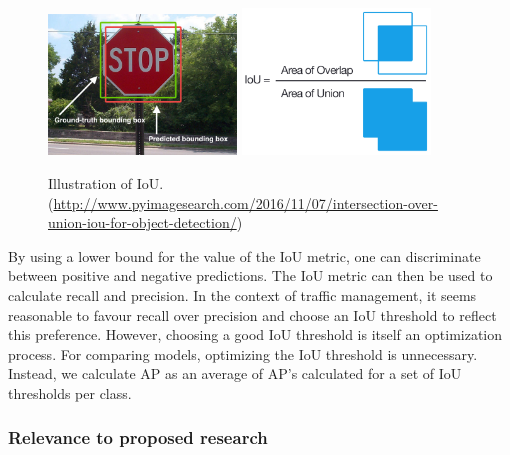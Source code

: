 \documentclass[]{article}
\begin{document}
	\begin{figure}[h]
		\centering
		\includegraphics[width=5cm]{Intersection_over_Union_-_object_detection_bounding_boxes.jpg}
		\includegraphics[width=5cm]{Intersection_over_Union_-_visual_equation.png}
		\caption{Illustration of IoU.\\ \footnotesize{(\url{http://www.pyimagesearch.com/2016/11/07/intersection-over-union-iou-for-object-detection/})}}
	\end{figure}
	
	By using a lower bound for the value of the IoU metric, one can discriminate between positive and negative predictions. The IoU metric can then be used to calculate recall and precision. In the context of traffic management, it seems reasonable to favour recall over precision and choose an IoU threshold to reflect this preference. However, choosing a good IoU threshold is itself an optimization process. For comparing models, optimizing the IoU threshold is unnecessary. Instead, we calculate AP as an average of AP's calculated for a set of IoU thresholds per class.
	
\subsubsection{Relevance to proposed research}
	
\end{document}
